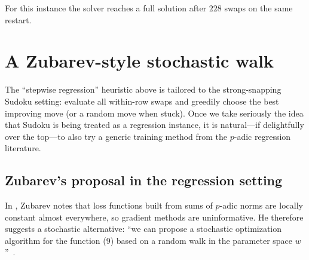 \documentclass[11pt]{article}
\begin{document}
\begin{table}[t]
\centering
{}
\caption{First eight swap steps for the example puzzle (seed 0). Rows/columns are 1-indexed.}
\label{tab:trace}
\end{table}

For this instance the solver reaches a full solution after $228$ swaps on the same restart.

\section{A Zubarev-style stochastic walk}
The ``stepwise regression'' heuristic above is tailored to the strong-snapping Sudoku setting: evaluate all within-row swaps and greedily choose the best improving move (or a random move when stuck). Once we take seriously the idea that Sudoku is being treated as a regression instance, it is natural---if delightfully over the top---to also try a generic training method from the $p$-adic regression literature.

\subsection{Zubarev's proposal in the regression setting}
In \cite{zubarev2025padic}, Zubarev notes that loss functions built from sums of $p$-adic norms are locally constant almost everywhere, so gradient methods are uninformative. He therefore suggests a stochastic alternative: ``we can propose a stochastic optimization algorithm for the function (9) based on a random walk in the parameter space $w$''~\cite{zubarev2025padic}.
\end{document}

